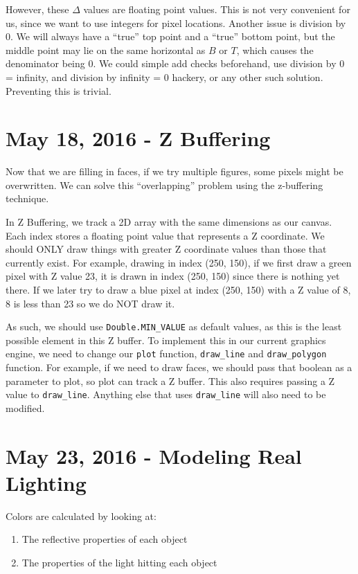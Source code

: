 \documentclass[11pt,fleqn]{article}
\theoremstyle{definition}
\begin{document}
However, these $\Delta$ values are floating point values. This is not very convenient
for us, since we want to use integers for pixel locations. Another issue is division
by 0. We will always have a ``true'' top point and a ``true'' bottom point, but the
middle point may lie on the same horizontal as $B$ or $T$, which causes the
denominator being 0. We could simple add checks beforehand, use division by 0 =
infinity, and division by infinity = 0 hackery, or any other such solution.
Preventing this is trivial.

\section{May 18, 2016 - Z Buffering}

Now that we are filling in faces, if we try multiple figures, some pixels might be
overwritten. We can solve this ``overlapping'' problem using the z-buffering
technique.

In Z Buffering, we track a 2D array with the same dimensions as our canvas. Each
index stores a floating point value that represents a Z coordinate. We should ONLY
draw things with greater Z coordinate values than those that currently exist. For
example, drawing in index (250, 150), if we first draw a green pixel with Z value 23,
it is drawn in index (250, 150) since there is nothing yet there. If we later try to
draw a blue pixel at index (250, 150) with a Z value of 8, 8 is less than 23 so we do
NOT draw it.

As such, we should use \texttt{Double.MIN\_VALUE} as default values, as this is the
least possible element in this Z buffer. To implement this in our current graphics
engine, we need to change our \texttt{plot} function, \texttt{draw\_line} and
\texttt{draw\_polygon} function. For example, if we need to draw faces, we should
pass that boolean as a parameter to plot, so plot can track a Z buffer. This also
requires passing a Z value to \texttt{draw\_line}. Anything else that uses
\texttt{draw\_line} will also need to be modified.

\section{May 23, 2016 - Modeling Real Lighting}

Colors are calculated by looking at:

\begin{enumerate}
    \item The reflective properties of each object
    \item The properties of the light hitting each object
\end{enumerate}
\end{document}
